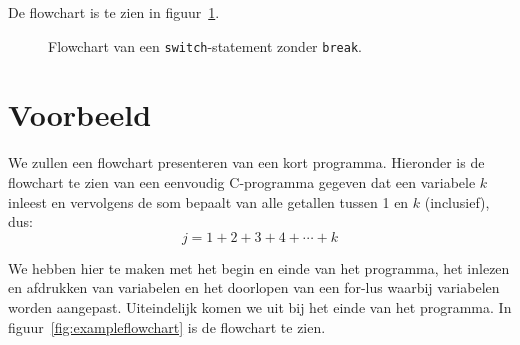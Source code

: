 De flowchart is te zien in figuur~\ref{fig:switch2}.

\begin{figure}[!ht]
\centering
{}
\caption{Flowchart van een \texttt{switch}-statement zonder \texttt{break}.}
\label{fig:switch2}
\end{figure}


\section{Voorbeeld}
We zullen een flowchart presenteren van een kort programma.
Hieronder is de flowchart te zien van een eenvoudig C-programma gegeven dat een variabele $k$ inleest en
vervolgens de som bepaalt van alle getallen tussen 1 en $k$ (inclusief), dus:
%
\begin{equation}
j = 1 + 2 +3 + 4 +\cdots + k
\end{equation}

%
%
%    
%
%    
%        

We hebben hier te maken met het begin en einde van het programma, het inlezen en
afdrukken van variabelen en het doorlopen van een for-lus waarbij variabelen worden
aangepast. Uiteindelijk komen we uit bij het einde van het programma.
In figuur~\ref{fig:exampleflowchart} is de flowchart te zien.


